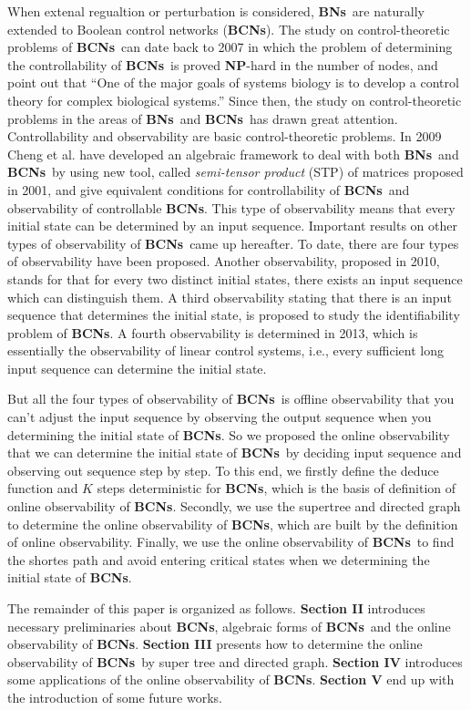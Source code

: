 \documentclass[letterpaper, 10 pt, conference]{ieeeconf}  %
\def \BNs {{\bf BNs}}
\def \BCNs {{\bf BCNs}}
\begin{document}
When extenal regualtion or perturbation is considered, \BNs\ are naturally extended to Boolean control networks ({\bf BCNs}). The study on control-theoretic problems of \BCNs\ can date back to 2007 in which the problem of determining the controllability of \BCNs\ is proved {\bf NP}-hard in the number of nodes, and point out that ``One of the major goals of systems biology is to develop a control theory for complex biological systems.'' Since then, the study on control-theoretic problems in the areas of \BNs\ and \BCNs\ has drawn great attention. Controllability and observability are basic control-theoretic problems. In 2009 Cheng et al. have developed an algebraic framework to deal with both \BNs\ and \BCNs\ by using new tool, called \emph{semi-tensor product} (STP) of matrices proposed in 2001, and give equivalent conditions for controllability of \BCNs\ and observability of controllable {\bf BCNs}. This type of observability means that every initial state can be determined by an input sequence. Important results on other types of observability of \BCNs\ came up hereafter. To date, there are four types of observability have been proposed. Another observability, proposed in 2010, stands for that for every two distinct initial states, there exists an input sequence which can distinguish them. A third observability stating that there is an input sequence that determines the initial state, is proposed to study the identifiability problem of {\bf BCNs}. A fourth observability is determined in 2013, which is essentially the observability of linear control systems, i.e., every sufficient long input sequence can determine the initial state.

But all the four types of observability of \BCNs\ is offline observability that you can't adjust the input sequence by observing the output sequence when you determining the initial state of {\bf BCNs}. So we proposed the online observability that we can determine the initial state of \BCNs\ by deciding input sequence and observing out sequence step by step. To this end, we firstly define the deduce function and $K$ steps deterministic for {\bf BCNs}, which is the basis of definition of online observability of {\bf BCNs}. Secondly, we use the supertree and directed graph to determine the online observability of {\bf BCNs}, which are built by the definition of online observability. Finally, we use the online observability of \BCNs\ to find the shortes path and avoid entering critical states when we determining the initial state of {\bf BCNs}. 

The remainder of this paper is organized as follows. {\bf Section II} introduces necessary preliminaries about {\bf BCNs}, algebraic forms of \BCNs\ and the online observability of {\bf BCNs}. {\bf Section III} presents how to determine the online observability of \BCNs\ by super tree and directed graph. {\bf Section IV} introduces some applications of the online observability of {\bf BCNs}. {\bf Section V} end up  with the introduction of some future works.
\end{document}
